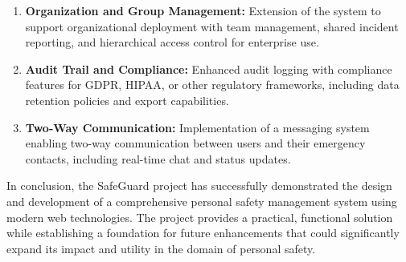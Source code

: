 \begin{enumerate}[label=\textbf{F\arabic*.}]
  \item \textbf{Organization and Group Management:} Extension of the system to support organizational deployment with team management, shared incident reporting, and hierarchical access control for enterprise use.

  \item \textbf{Audit Trail and Compliance:} Enhanced audit logging with compliance features for GDPR, HIPAA, or other regulatory frameworks, including data retention policies and export capabilities.

  \item \textbf{Two-Way Communication:} Implementation of a messaging system enabling two-way communication between users and their emergency contacts, including real-time chat and status updates.
\end{enumerate}

In conclusion, the SafeGuard project has successfully demonstrated the design and development of a comprehensive personal safety management system using modern web technologies. The project provides a practical, functional solution while establishing a foundation for future enhancements that could significantly expand its impact and utility in the domain of personal safety.
